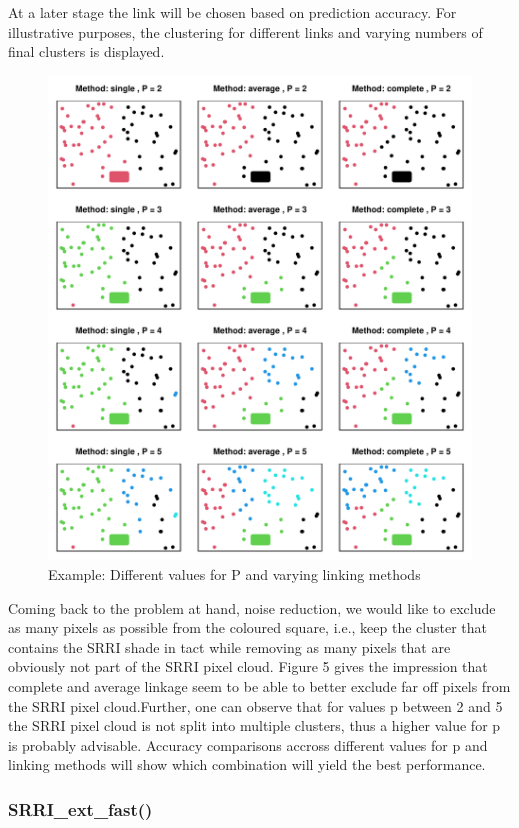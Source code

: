 \documentclass[aodsor,preprint]{imsart}
\numberwithin{equation}{section}
\theoremstyle{plain}
\begin{document}
At a later stage the link will be chosen based on prediction accuracy. For illustrative purposes, the clustering for different links and varying numbers of final clusters is displayed.\newpage

\begin{figure}[H]
	\includegraphics[width = 12cm]{methodsclust.pdf}
	\caption{Example: Different values for P and varying linking methods}
\end{figure}

Coming back to the problem at hand, noise reduction, we would like to exclude as many pixels as possible from the coloured square, i.e., keep the cluster that contains the SRRI shade in tact while removing as many pixels that are obviously not part of the SRRI pixel cloud. Figure 5 gives the impression that complete and average linkage seem to be able to better exclude far off pixels from the SRRI pixel cloud.Further, one can observe that for values p between 2 and 5 the SRRI pixel cloud is not split into multiple clusters, thus a higher value for p is probably advisable. Accuracy comparisons accross different values for p and linking methods will show which combination will yield the best performance.\newpage

\subsubsection{SRRI\_ext\_fast()}
\end{document}
